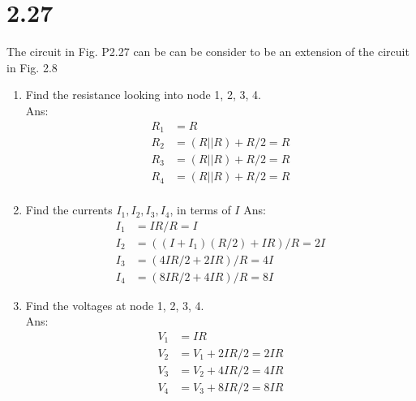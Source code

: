 \documentclass[12pt, a4paper]{article}
\begin{document}
\section{2.27}
The circuit in Fig. P2.27 can be can be consider to be an extension of the circuit in Fig. 2.8


\begin{enumerate}[label=(\alph*)]
  \item Find the resistance looking into node 1, 2, 3, 4.\\
    Ans: 
    \begin{align*}
      R_1 &= R\\
      R_2 &= (R || R) + R / 2 = R\\
      R_3 &= (R || R) + R / 2 = R\\
      R_4 &= (R || R) + R / 2 = R\\
    \end{align*}
  \item Find the currents $I_1, I_2, I_3, I_4$, in terms of $I$
    Ans:
    \begin{align*}
      I_1 &= IR / R = I\\
      I_2 &= ((I+I_1) (R/2) + IR) / R= 2I\\
      I_3 &= (4IR/2 + 2IR)/R = 4I \\
      I_4 &= (8IR/2 + 4IR)/R = 8I 
    \end{align*}
  \item Find the voltages at node 1, 2, 3, 4.\\
    Ans:
    \begin{align*}
      V_1 &= IR               \\
      V_2 &= V_1 + 2IR/2 = 2IR\\
      V_3 &= V_2 + 4IR/2 = 4IR\\
      V_4 &= V_3 + 8IR/2 = 8IR
    \end{align*}
\end{enumerate}
\end{document}
